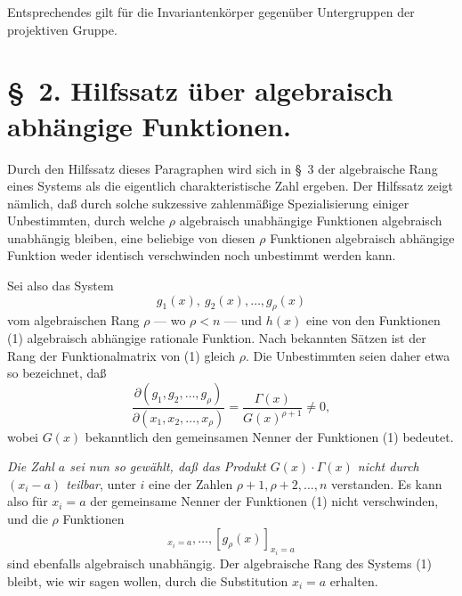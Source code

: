 Entsprechendes gilt für die Invariantenkörper gegenüber Untergruppen der projektiven Gruppe.

\section*{\S\ 2. Hilfssatz über algebraisch abhängige Funktionen.}

Durch den Hilfssatz dieses Paragraphen wird sich in \S\ 3 der algebraische Rang eines Systems als die eigentlich charakteristische Zahl ergeben. Der Hilfssatz zeigt nämlich, daß durch solche sukzessive zahlenmäßige Spezialisierung einiger Unbestimmten, durch welche $\rho$ algebraisch unabhängige Funktionen algebraisch unabhängig bleiben, eine beliebige von diesen $\rho$ Funktionen algebraisch abhängige Funktion weder identisch verschwinden noch unbestimmt werden kann.

Sei also das System
\begin{equation}
  g_1(x),\ g_2(x),\ldots,g_\rho(x)
\tag{1}
\end{equation}
vom algebraischen Rang $\rho$ --- wo $\rho<n$ --- und $h(x)$ eine von den Funktionen (1) algebraisch abhängige rationale Funktion. Nach bekannten Sätzen ist der Rang der Funktionalmatrix von (1) gleich $\rho$. Die Unbestimmten seien daher etwa so bezeichnet, daß
\begin{equation}
 \frac{\partial(g_1,g_2,\ldots,g_\rho)}{\partial(x_1,x_2,\ldots,x_\rho)}
 =\frac{\Gamma(x)}{G(x)^{\rho+1}}\ne0,
\tag{2}
\end{equation}
wobei $G(x)$ bekanntlich den gemeinsamen Nenner der Funktionen (1) bedeutet.

\emph{Die Zahl $a$ sei nun so gewählt, daß das Produkt $G(x)\cdot\Gamma(x)$ nicht durch $(x_i-a)$ teilbar}, unter $i$ eine der Zahlen $\rho+1,\rho+2,\ldots,n$ verstanden. Es kann also für $x_i=a$ der gemeinsame Nenner der Funktionen (1) nicht verschwinden, und die $\rho$ Funktionen
\begin{equation}
  [g_1(x)]_{x_i=a},\ldots,[g_\rho(x)]_{x_i=a}
\tag{3}
\end{equation}
sind ebenfalls algebraisch unabhängig. Der algebraische Rang des Systems (1) bleibt, wie wir sagen wollen, durch die Substitution $x_i=a$ erhalten.

